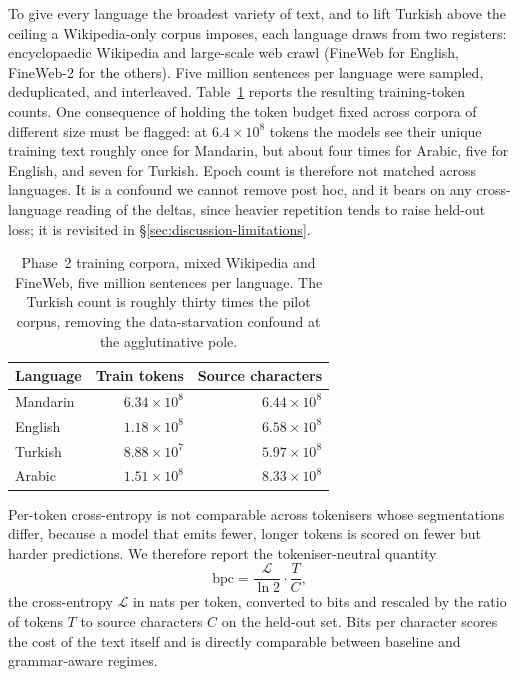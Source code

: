 To give every language the broadest variety of text, and to lift Turkish above the ceiling a Wikipedia-only corpus imposes, each language draws from two registers: encyclopaedic Wikipedia and large-scale web crawl (FineWeb for English, FineWeb-2 for the others). Five million sentences per language were sampled, deduplicated, and interleaved. Table~\ref{tab:phase2-corpus} reports the resulting training-token counts. One consequence of holding the token budget fixed across corpora of different size must be flagged: at $6.4 \times 10^8$ tokens the models see their unique training text roughly once for Mandarin, but about four times for Arabic, five for English, and seven for Turkish. Epoch count is therefore not matched across languages. It is a confound we cannot remove post hoc, and it bears on any cross-language reading of the deltas, since heavier repetition tends to raise held-out loss; it is revisited in \S\ref{sec:discussion-limitations}.

\begin{table}[H]
\centering
\small
\begin{tabular}{lrr}
\toprule
Language & Train tokens & Source characters \\
\midrule
Mandarin & $6.34 \times 10^8$ & $6.44 \times 10^8$ \\
English  & $1.18 \times 10^8$ & $6.58 \times 10^8$ \\
Turkish  & $8.88 \times 10^7$ & $5.97 \times 10^8$ \\
Arabic   & $1.51 \times 10^8$ & $8.33 \times 10^8$ \\
\bottomrule
\end{tabular}
\caption{Phase~2 training corpora, mixed Wikipedia and FineWeb, five million sentences per language. The Turkish count is roughly thirty times the pilot corpus, removing the data-starvation confound at the agglutinative pole.}
\label{tab:phase2-corpus}
\end{table}

Per-token cross-entropy is not comparable across tokenisers whose segmentations differ, because a model that emits fewer, longer tokens is scored on fewer but harder predictions. We therefore report the tokeniser-neutral quantity
\[
\mathrm{bpc} = \frac{\mathcal{L}}{\ln 2} \cdot \frac{T}{C},
\]
the cross-entropy $\mathcal{L}$ in nats per token, converted to bits and rescaled by the ratio of tokens $T$ to source characters $C$ on the held-out set. Bits per character scores the cost of the text itself and is directly comparable between baseline and grammar-aware regimes.

